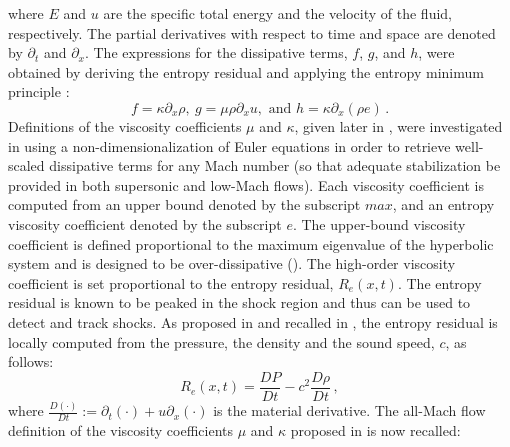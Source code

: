\documentclass{mc2015}
\begin{document}
%
where $E$ and $u$ are the specific total energy and the velocity of the fluid, respectively. The partial derivatives with respect to time and space are denoted by $\partial_t$ and $\partial_x$. The expressions for the dissipative terms, $f$, $g$, and $h$, were obtained by deriving the entropy residual and applying the entropy minimum principle \cite{jlg}:
%
\begin{equation}
f = \kappa \partial_x \rho , \ g = \mu \rho \partial_x u, \text{  and  } h = \kappa \partial_x \left( \rho e \right) \, . 
\end{equation}
%
Definitions of the viscosity coefficients $\mu$ and $\kappa$, given later in , were investigated in \cite{Marco_paper_low_mach} using a non-dimensionalization of Euler equations in order to retrieve well-scaled dissipative terms for any Mach number (so that adequate stabilization be provided in both supersonic and low-Mach flows). Each viscosity coefficient is computed from an upper bound denoted by the subscript $max$, and an entropy viscosity coefficient denoted by the subscript $e$. The upper-bound viscosity coefficient is defined proportional to the maximum eigenvalue of the hyperbolic system and is designed to be over-dissipative (). The high-order viscosity coefficient is set proportional to the entropy residual, $R_e(x,t)$.
The entropy residual is known to be peaked in the shock region \cite{Leveque} and thus can be used to detect and track shocks. As proposed in \cite{Marco_paper_low_mach} and recalled in , the entropy residual is locally computed from the pressure, the density and the sound speed, $c$, as follows:
%
\begin{equation}\label{eq:ent-res}
R_e(x,t) = \frac{DP}{Dt} - c^2\frac{D\rho}{Dt} \, ,
\end{equation}
%
where $\frac{D (\cdot)}{Dt} := \partial_t(\cdot) + u  \partial_x(\cdot)$ is the material derivative. 
The all-Mach flow definition of the viscosity coefficients $\mu$ and $\kappa$ proposed in \cite{Marco_paper_low_mach} is now recalled:
\end{document}
